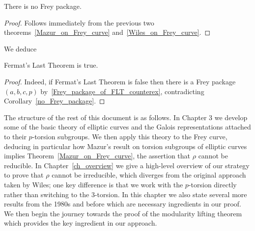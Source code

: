\begin{corollary}\label{no_Frey_package}\leanok There is no Frey package.\end{corollary}
\begin{proof}\leanok Follows immediately from the previous two theorems~\ref{Mazur_on_Frey_curve} and~\ref{Wiles_on_Frey_curve}.\end{proof}

We deduce

\begin{corollary}\label{FLT}\leanok Fermat's Last Theorem is true.\end{corollary}
\begin{proof}\leanok
Indeed, if Fermat's Last Theorem is false then there is a Frey package $(a,b,c,p)$ by~\ref{Frey_package_of_FLT_counterex}, contradicting Corollary~\ref{no_Frey_package}.
\end{proof}

The structure of the rest of this document is as follows. In Chapter 3 we develop some of the basic theory of elliptic curves and the Galois representations attached to their $p$-torsion subgroups. We then apply this theory to the Frey curve, deducing in particular how Mazur's result on torsion subgroups of elliptic curves implies Theorem~\ref{Mazur_on_Frey_curve}, the assertion that $\rho$ cannot be reducible. In Chapter~\ref{ch_overview} we give a high-level overview of our strategy to prove that $\rho$ cannot be irreducible, which diverges from the original approach taken by Wiles; one key difference is that we work with the $p$-torsion directly rather than switching to the 3-torsion. In this chapter we also state several more results from the 1980s and before which are necessary ingredients in our proof. We then begin the journey towards the proof of the modularity lifting theorem which provides the key ingredient in our approach.